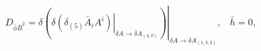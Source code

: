 \begin{equation*}
D_{\bar{\phi}\bar{B}^{2}}=\left. \delta \left( \delta \left. (\delta _{(5)}%
\bar{A}_{i}A^{i})\right| _{\delta A\longrightarrow \bar{\delta}%
A_{(4,0)}}\right) \right| _{\delta A\longrightarrow \delta
A_{(1,3,2)}},\;\;\;\bar{h}=0,
\end{equation*}


